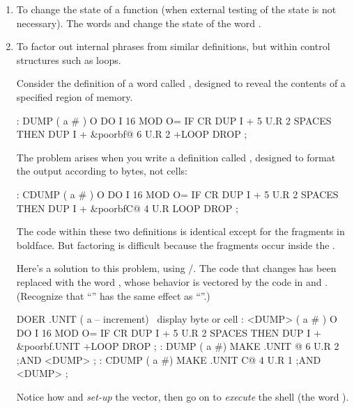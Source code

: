\begin{enumerate}
\item To change the state of a function (when external testing of the state is not
necessary). The words  and  change the state of
the word .

\item To factor out internal phrases from similar definitions, but within control
structures such as loops.

Consider the definition of a word called , designed to reveal the
contents of a specified region of memory.


\begin{Code}[commandchars=\&\{\}]
: DUMP  ( a # )
   O DO  I 16 MOD O= IF  CR  DUP I +  5 U.R  2 SPACES  THEN
   DUP I +  &poorbf{@ 6 U.R  2 +LOOP}  DROP ;
\end{Code}
The problem arises when you write a definition called , designed to
format the output according to bytes, not cells:

\begin{Code}[commandchars=\&\{\}]
: CDUMP  ( a # )
   O DO  I 16 MOD O= IF  CR  DUP I +  5 U.R  2 SPACES  THEN
   DUP I +  &poorbf{C@  4 U.R  LOOP} DROP ;
\end{Code}

The code within these two definitions is identical except for the fragments
in boldface. But factoring is difficult because the fragments occur inside the
.

Here's a solution to this problem, using
/. The code that changes has been replaced
with the word , whose behavior is vectored by the code in
 and . (Recognize that ``''
has the same effect as ``''.)

\begin{Code}[commandchars=\&\{\}]
DOER .UNIT ( a -- increment)  \ display byte or cell
: <DUMP>  ( a # )
   O DO  I 16 MOD O= IF  CR  DUP I +  5 U.R  2 SPACES  THEN
   DUP I + &poorbf{.UNIT}  +LOOP  DROP ;
: DUMP   ( a #)  MAKE .UNIT  @  6 U.R  2 ;AND <DUMP> ;
: CDUMP ( a #)   MAKE .UNIT C@  4 U.R  1 ;AND <DUMP> ;
\end{Code}
Notice how  and  \emph{set-up} the vector, then go on to
\emph{execute} the shell (the word ).


\end{enumerate}

